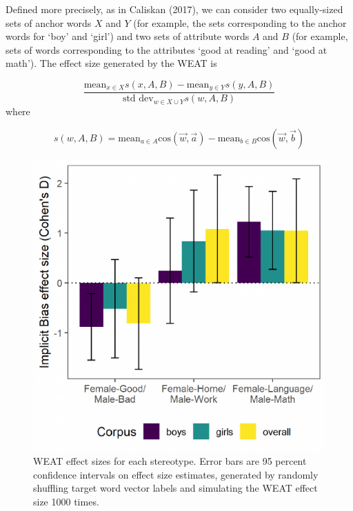 \documentclass[10pt, letterpaper]{article}
\newenvironment{CodeChunk}{}{}
\begin{document}
Defined more precisely, as in Caliskan (2017), we can consider two
equally-sized sets of anchor words \(X\) and \(Y\) (for example, the
sets corresponding to the anchor words for `boy' and `girl') and two
sets of attribute words \(A\) and \(B\) (for example, sets of words
corresponding to the attributes `good at reading' and `good at math').
The effect size generated by the WEAT is

\[\frac{\text{mean}_{x \in X}s(x, A, B) - \text{mean}_{y \in Y}s(y, A, B)}{\text{std dev}_{w \in X \cup Y}s(w, A, B)}\]
where

\[s(w, A, B) = \text{mean}_{a \in A}\text{cos}(\vec{w}, \vec{a}) - \text{mean}_{b \in B}\text{cos}(\vec{w}, \vec{b})\]

\begin{CodeChunk}
\begin{figure}[h]

{\centering \includegraphics{figs/weatplot-1} 

}

\caption[WEAT effect sizes for each stereotype]{WEAT effect sizes for each stereotype. Error bars are 95 percent confidence intervals on effect size estimates, generated by randomly shuffling target word vector labels and simulating the WEAT effect size 1000 times.}\label{fig:weatplot}
\end{figure}
\end{CodeChunk}
\end{document}
